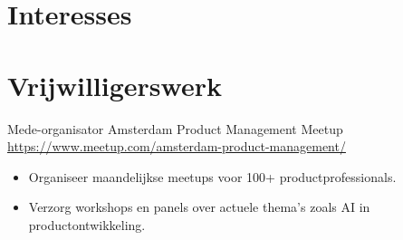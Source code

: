 \documentclass[a4paper, serif, 10pt]{moderncv}
\begin{document}
\section{Interesses}

\section{Vrijwilligerswerk}

        {Mede-organisator}
        {Amsterdam Product Management Meetup}
        {\url{https://www.meetup.com/amsterdam-product-management/}}
        {}
        {\begin{itemize}
\item Organiseer maandelijkse meetups voor 100+ productprofessionals.
\item Verzorg workshops en panels over actuele thema's zoals AI in productontwikkeling.
\end{itemize}}
    
\end{document}
